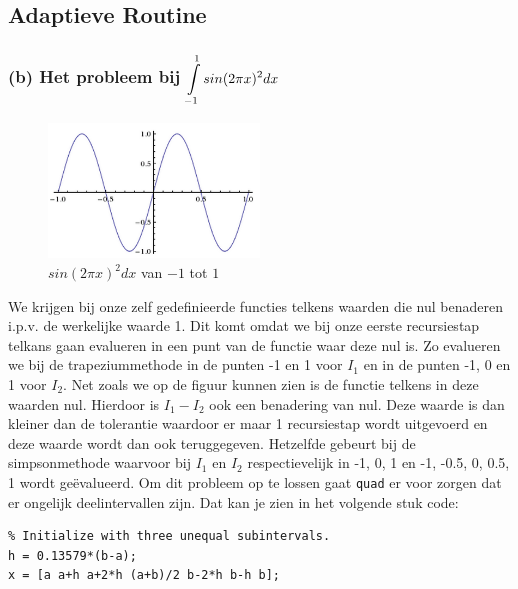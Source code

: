 \documentclass[11pt,a4paper]{article}
\begin{document}
\subsection{Adaptieve Routine}

\subsubsection*{(b) Het probleem bij $\mathop{\mathlarger{\int\limits_{-1}^1sin(2\pi x)^2dx}}$}

\begin{figure}
	\begin{center}
	\vspace{-85pt}
	\includegraphics[width=0.5\textwidth]{12b.png}
	\caption*{$sin(2\pi x)^2dx$ van $-1$ tot $1$}
	\vspace{-25pt}
	\end{center}
	\end{figure}
We krijgen bij onze zelf gedefinieerde functies telkens waarden die nul benaderen i.p.v. de werkelijke waarde 1. Dit komt omdat we bij onze eerste recursiestap telkans gaan evalueren in een punt van de functie waar deze nul is. Zo evalueren we bij de trapeziummethode in de punten -1 en 1 voor $I_1$ en in de punten -1, 0 en 1 voor $I_2$. Net zoals we op de figuur kunnen zien is de functie telkens in deze waarden nul. Hierdoor is $I_1 - I_2$ ook een benadering van nul. Deze waarde is dan kleiner dan de tolerantie waardoor er maar 1 recursiestap wordt uitgevoerd en deze waarde wordt dan ook teruggegeven. Hetzelfde gebeurt bij de simpsonmethode waarvoor bij $I_1$ en $I_2$ respectievelijk in -1, 0, 1 en -1, -0.5, 0, 0.5, 1 wordt ge\"evalueerd. Om dit probleem op te lossen gaat \verb|quad| er voor zorgen dat er ongelijk deelintervallen zijn. Dat kan je zien in het volgende stuk code:
\begin{verbatim}
% Initialize with three unequal subintervals.
h = 0.13579*(b-a);
x = [a a+h a+2*h (a+b)/2 b-2*h b-h b];
\end{verbatim}
\end{document}
